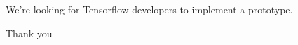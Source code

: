 \documentclass{beamer}
\begin{document}

\begin{frame}
We're looking for Tensorflow developers to implement a prototype.

\vspace*{1cm}
\Large{\centerline{Thank you}}

\end{frame}
\end{document}
